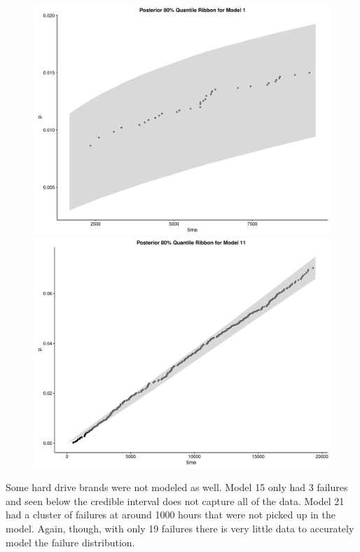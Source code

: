 \documentclass{scrartcl}
\begin{document}
\begin{figure}[H]
  \centering
  \begin{minipage}[b]{0.4\textwidth}
    \includegraphics[width=\textwidth]{plot1.pdf}
  \end{minipage}
  \hfill
  \begin{minipage}[b]{0.4\textwidth}
    \includegraphics[width=\textwidth]{plot2.pdf}
  \end{minipage}
\end{figure}

\noindent Some hard drive brands were not modeled as well.  Model 15 only had 3 failures and seen below the credible interval does not capture all of the data.  Model 21 had a cluster of failures at around 1000 hours that were not picked up in the model.  Again, though, with only 19 failures there is very little data to accurately model the failure distribution.  
\end{document}
